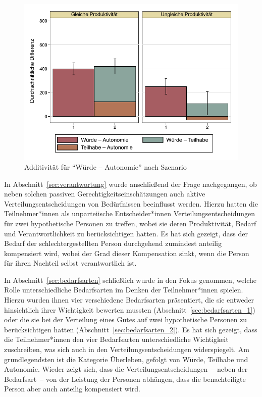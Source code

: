 \documentclass[justified,nobib,symmetric,twoside]{tufte-handout}
\begin{document}
\begin{figure}[t]\label{fig:abbildung_19}
   \center
   \caption{Additivität für \enquote{Würde -- Autonomie} nach Szenario}
   \includegraphics[width=0.99\linewidth]{figure_19.pdf}
\end{figure}

In Abschnitt~\ref{sec:verantwortung} wurde anschließend der Frage nachgegangen, ob neben solchen passiven Gerechtigkeitseinschätzungen auch aktive Verteilungsentscheidungen von Bedürfnissen beeinflusst werden.
Hierzu hatten die Teilnehmer*innen als unparteiische Entscheider*innen Verteilungsentscheidungen für zwei hypothetische Personen zu treffen, wobei sie deren Produktivität, Bedarf und Verantwortlichkeit zu berücksichtigen hatten.
Es hat sich gezeigt, dass der Bedarf der schlechtergestellten Person durchgehend zumindest anteilig kompensiert wird, wobei der Grad dieser Kompensation sinkt, wenn die Person für ihren Nachteil selbst verantwortlich ist.

In Abschnitt~\ref{sec:bedarfsarten} schließlich wurde in den Fokus genommen, welche Rolle unterschiedliche Bedarfsarten im Denken der Teilnehmer*innen spielen.
Hierzu wurden ihnen vier verschiedene Bedarfsarten präsentiert, die sie entweder hinsichtlich ihrer Wichtigkeit bewerten mussten (Abschnitt~\ref{sec:bedarfsarten_1}) oder die sie bei der Verteilung eines Gutes auf zwei hypothetische Personen zu berücksichtigen hatten (Abschnitt~\ref{sec:bedarfsarten_2}).
Es hat sich gezeigt, dass die Teilnehmer*innen den vier Bedarfsarten unterschiedliche Wichtigkeit zuschreiben, was sich auch in den Verteilungsentscheidungen widerspiegelt.
Am grundlegendsten ist die Kategorie Überleben, gefolgt von Würde, Teilhabe und Autonomie.
Wieder zeigt sich, dass die Verteilungsentscheidungen~-- neben der Bedarfsart~-- von der Leistung der Personen abhängen, dass die benachteiligte Person aber auch anteilig kompensiert wird.
\end{document}
